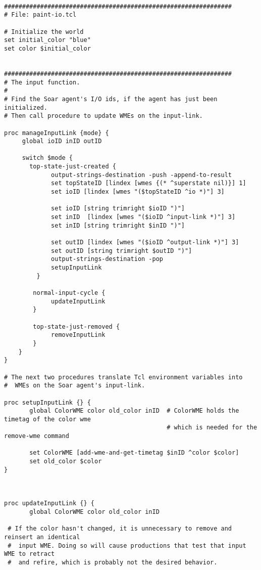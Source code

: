 \footnotesize
\begin{verbatim}

###############################################################
# File: paint-io.tcl

# Initialize the world
set initial_color "blue"
set color $initial_color


###############################################################
# The input function.
#
# Find the Soar agent's I/O ids, if the agent has just been initialized.
# Then call procedure to update WMEs on the input-link.

proc manageInputLink {mode} {
     global ioID inID outID
 
     switch $mode {
       top-state-just-created {
             output-strings-destination -push -append-to-result
             set topStateID [lindex [wmes {(* ^superstate nil)}] 1]
             set ioID [lindex [wmes "($topStateID ^io *)"] 3]
 
             set ioID [string trimright $ioID ")"]
             set inID  [lindex [wmes "($ioID ^input-link *)"] 3]
             set inID [string trimright $inID ")"]
 
             set outID [lindex [wmes "($ioID ^output-link *)"] 3]
             set outID [string trimright $outID ")"]
             output-strings-destination -pop
             setupInputLink
         }
 
        normal-input-cycle {
             updateInputLink
        }
        
        top-state-just-removed {
             removeInputLink
        }
    }	
}

# The next two procedures translate Tcl environment variables into
#  WMEs on the Soar agent's input-link.

proc setupInputLink {} {
       global ColorWME color old_color inID  # ColorWME holds the timetag of the color wme
                                             # which is needed for the remove-wme command

       set ColorWME [add-wme-and-get-timetag $inID ^color $color]
       set old_color $color
}

 

proc updateInputLink {} {
       global ColorWME color old_color inID     

 # If the color hasn't changed, it is unnecessary to remove and reinsert an identical
 #  input WME. Doing so will cause productions that test that input WME to retract
 #  and refire, which is probably not the desired behavior.
   


\end{verbatim}
